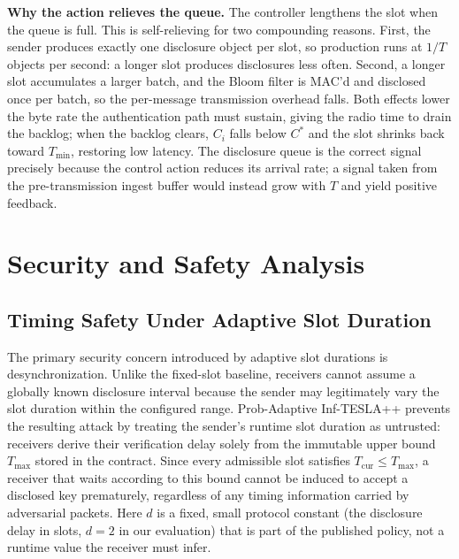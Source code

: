 \documentclass[conference]{IEEEtran}
\begin{document}
\textbf{Why the action relieves the queue.} The controller lengthens the slot
when the queue is full. This is self-relieving for two compounding reasons.
First, the sender produces exactly one disclosure object per slot, so production
runs at $1/T$ objects per second: a longer slot produces disclosures less often.
Second, a longer slot accumulates a larger batch, and the Bloom filter is MAC'd
and disclosed once per batch, so the per-message transmission overhead falls.
Both effects lower the byte rate the authentication path must sustain, giving the
radio time to drain the backlog; when the backlog clears, $C_i$ falls below
$C^{\ast}$ and the slot shrinks back toward $T_{\min}$, restoring low latency. The
disclosure queue is the correct signal precisely because the control action
reduces its arrival rate; a signal taken from the pre-transmission ingest buffer
would instead grow with $T$ and yield positive feedback.

\section{Security and Safety Analysis}

\subsection{Timing Safety Under Adaptive Slot Duration}
The primary security concern introduced by adaptive slot durations is
desynchronization. Unlike the fixed-slot baseline, receivers cannot assume a
globally known disclosure interval because the sender may legitimately vary the
slot duration within the configured range. Prob-Adaptive Inf-TESLA++ prevents the
resulting attack by treating the sender's runtime slot duration as untrusted:
receivers derive their verification delay solely from the immutable upper bound
$T_{\max}$ stored in the contract. Since every admissible slot satisfies
$T_{\mathrm{cur}}\le T_{\max}$, a receiver that waits according to this bound
cannot be induced to accept a disclosed key prematurely, regardless of any timing
information carried by adversarial packets. Here $d$ is a fixed, small
protocol constant (the disclosure delay in slots, $d=2$ in our evaluation) that
is part of the published policy, not a runtime value the receiver must infer.
\end{document}
